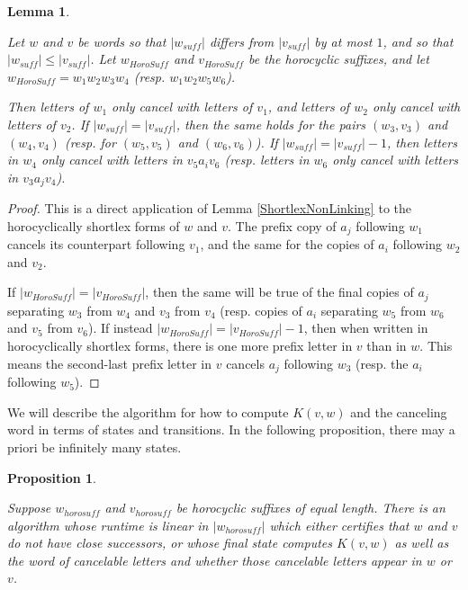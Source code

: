 \documentclass[10pt,a4paper]{amsart}
\newtheorem{lemma}[theorem]{Lemma}
\newtheorem{proposition}[theorem]{Proposition}
\theoremstyle{definition}
\theoremstyle{remark}
\begin{document}
	
	\begin{lemma} \label{MatchedCancellation}
		
		Let $w$ and $v$ be words so that $|w_{suff}|$ differs from $|v_{suff}|$ by at most $1$, and so that $|w_{suff}|\le |v_{suff}|$. Let $w_{HoroSuff}$ and $v_{HoroSuff}$ be the horocyclic suffixes, and let \newline $w_{HoroSuff}=w_1w_2w_3w_4$ (resp. $w_1w_2w_5w_6$).
		
		Then letters of $w_1$ only cancel with letters of $v_1$, and letters of $w_2$ only cancel with letters of $v_2$. If $|w_{suff}|=|v_{suff}|$, then the same holds for the pairs $(w_3, v_3)$ and $(w_4, v_4)$ (resp. for $(w_5, v_5)$ and $(w_6, v_6)$). If $|w_{suff}|=|v_{suff}|-1$, then letters in $w_4$ only cancel with letters in $v_5a_iv_6$ (resp. letters in $w_6$ only cancel with letters in $v_3a_jv_4$).
		
	\end{lemma}
	
	\begin{proof}
		
		This is a direct application of Lemma \ref{ShortlexNonLinking} to the horocyclically shortlex forms of $w$ and $v$. The prefix copy of $a_j$ following $w_1$ cancels its counterpart following $v_1$, and the same for the copies of $a_i$ following $w_2$ and $v_2$. 
		
		If $|w_{HoroSuff}|=|v_{HoroSuff}|$, then the same will be true of the final copies of $a_j$ separating $w_3$ from $w_4$ and $v_3$ from $v_4$ (resp. copies of $a_i$ separating $w_5$ from $w_6$ and $v_5$ from $v_6$). If instead $|w_{HoroSuff}|=|v_{HoroSuff}|-1$, then when written in horocyclically shortlex forms, there is one more prefix letter in $v$ than in $w$. This means the second-last prefix letter in $v$ cancels $a_j$ following $w_3$ (resp. the $a_i$ following $w_5$).
	\end{proof}
	
	We will describe the algorithm for how to compute $K(v,w)$ and the canceling word in terms of states and transitions. In the following proposition, there may a priori be infinitely many states.
	

	\begin{proposition}\label{DivergenceGraphEdgeAlgorithm}
		
		Suppose $w_{horosuff}$ and $v_{horosuff}$ be horocyclic suffixes of equal length. There is an algorithm whose runtime is linear in $|w_{horosuff}|$ which either certifies that $w$ and $v$ do not have close successors, or whose final state computes $K(v,w)$ as well as the word of cancelable letters and whether those cancelable letters appear in $w$ or $v$.
		
	\end{proposition}
\end{document}
